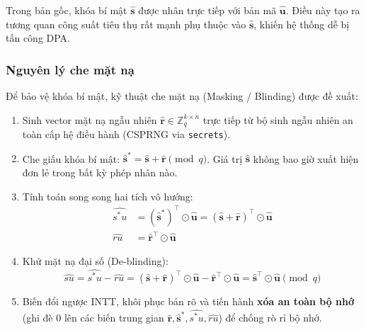 \documentclass[../LuanVan.tex]{subfiles}
\begin{document}
Trong bản gốc, khóa bí mật $\hat{\mathbf{s}}$ được nhân trực tiếp với bản mã $\hat{\mathbf{u}}$. Điều này tạo ra tương quan công suất tiêu thụ rất mạnh phụ thuộc vào $\hat{\mathbf{s}}$, khiến hệ thống dễ bị tấn công DPA.

\subsubsection{Nguyên lý che mặt nạ}

Để bảo vệ khóa bí mật, kỹ thuật che mặt nạ (Masking / Blinding) được đề xuất:
\begin{enumerate}[leftmargin=2cm]
    \item Sinh vector mặt nạ ngẫu nhiên $\hat{\mathbf{r}} \in \mathbb{Z}_q^{k \times n}$ trực tiếp từ bộ sinh ngẫu nhiên an toàn cấp hệ điều hành (CSPRNG via \texttt{secrets}).
    \item Che giấu khóa bí mật: $\hat{\mathbf{s}}^* = \hat{\mathbf{s}} + \hat{\mathbf{r}} \pmod q$. Giá trị $\hat{\mathbf{s}}$ không bao giờ xuất hiện đơn lẻ trong bất kỳ phép nhân nào.
    \item Tính toán song song hai tích vô hướng:
    \begin{align}
        \widehat{s^* u} &= (\hat{\mathbf{s}}^*)^\top \odot \hat{\mathbf{u}} = (\hat{\mathbf{s}} + \hat{\mathbf{r}})^\top \odot \hat{\mathbf{u}} \\
        \widehat{ru} &= \hat{\mathbf{r}}^\top \odot \hat{\mathbf{u}}
    \end{align}
    \item Khử mặt nạ đại số (De-blinding):
    \begin{equation}
        \widehat{su} = \widehat{s^* u} - \widehat{ru} = (\hat{\mathbf{s}} + \hat{\mathbf{r}})^\top \odot \hat{\mathbf{u}} - \hat{\mathbf{r}}^\top \odot \hat{\mathbf{u}} = \hat{\mathbf{s}}^\top \odot \hat{\mathbf{u}} \pmod q
    \end{equation}
    \item Biến đổi ngược INTT, khôi phục bản rõ và tiến hành \textbf{xóa an toàn bộ nhớ} (ghi đè 0 lên các biến trung gian $\hat{\mathbf{r}}, \hat{\mathbf{s}}^*, \widehat{s^*u}, \widehat{ru}$) để chống rò rỉ bộ nhớ.
\end{enumerate}
\end{document}
